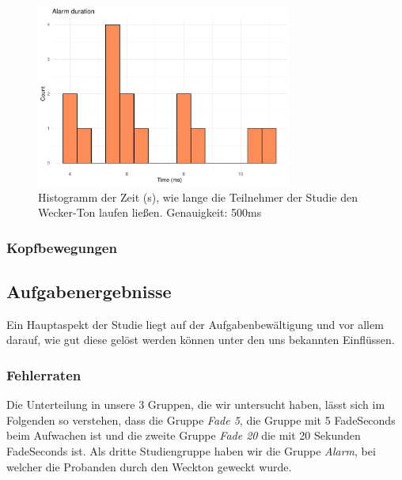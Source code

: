 \begin{figure}[H]
	\centering
	\includegraphics[width=0.75\textwidth]{./_StudyResults/alarmDurationHist}
	\caption{Histogramm der Zeit (s), wie lange die Teilnehmer der Studie den Wecker-Ton laufen ließen. Genauigkeit: 500ms}
	\label{fig:alarmDurationHist}
\end{figure}

\subsubsection{Kopfbewegungen}

\subsection{Aufgabenergebnisse} 

Ein Hauptaspekt der Studie liegt auf der Aufgabenbewältigung und vor allem darauf, wie gut diese gelöst werden können unter den uns bekannten Einflüssen. 

\subsubsection{Fehlerraten}

Die Unterteilung in unsere 3 Gruppen, die wir untersucht haben, lässt sich im Folgenden so verstehen, dass die Gruppe \textit{Fade 5}, die Gruppe mit 5 FadeSeconds beim Aufwachen ist und die zweite Gruppe \textit{Fade 20} die mit 20 Sekunden FadeSeconds ist. Als dritte Studiengruppe haben wir die Gruppe \textit{Alarm}, bei welcher die Probanden durch den Weckton geweckt wurde.

